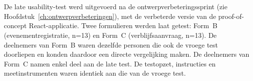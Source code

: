 
\chapter{}%
\label{ch:late-usability-test}


\section{}

De late usability-test werd uitgevoerd na de ontwerpverbeteringssprint (zie Hoofdstuk~\ref{ch:ontwerpverbeteringen}), met de verbeterde versie van de proof-of-concept React-applicatie. Twee formulieren werden laat getest: Form~B (evenementregistratie, n=13) en Form~C (verblijfsaanvraag, n=13). De deelnemers van Form~B waren dezelfde personen die ook de vroege test doorliepen en konden daardoor een directe vergelijking maken. De deelnemers van Form~C namen enkel deel aan de late test. De testopzet, instructies en meetinstrumenten waren identiek aan die van de vroege test.

\section{}
\label{sec:laat-formb}

\subsection{}

